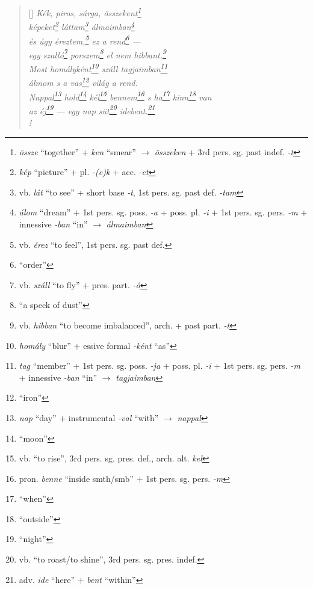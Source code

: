 \documentclass[a4paper,12pt,twoside,final]{book}
\begin{document}

\newpage

\settowidth{\versewidth}{Nappal hold kél bennem s ha kinn van}

\begin{verse}[\versewidth]
  \it
  Kék, piros, sárga, összekent\footnote{\emph{össze} ``together'' +
  \emph{ken} ``smear'' $\rightarrow$ \emph{összeken} + 3rd
  pers. sg. past indef. \emph{-t}} \\
  képeket\footnote{\emph{kép} ``picture'' + pl. \emph{-(e)k} +
  acc. \emph{-et}} láttam\footnote{vb. \emph{lát} ``to see'' +
  short base \emph{-t}, 1st pers. sg. past def. \emph{-tam}}
  álmaimban\footnote{\emph{álom} ``dream'' +
  1st pers. sg. poss. \emph{-a} + poss. pl. \emph{-i} + 1st
  pers. sg. pers. \emph{-m} + innessive \emph{-ban} ``in'' $\rightarrow$
  \emph{álmaimban}} \\
  és úgy éreztem,\footnote{vb. \emph{érez} ``to feel'', 1st
  pers. sg. past def.} ez a rend\footnote{``order''} --- \\
  egy szalló\footnote{vb. \emph{száll} ``to fly'' +
  pres. part. \emph{-ó}} porszem\footnote{``a speck of dust''} el nem
  hibbant.\footnote{vb. \emph{hibban}
  ``to become imbalanced'', arch. + past part. \emph{-t}} \\
  Most homályként\footnote{\emph{homály} ``blur'' +
  essive formal \emph{-ként} ``as''} száll tagjaimban\footnote{\emph{tag}
  ``member'' + 1st pers. sg. poss. \emph{-ja} +
  poss. pl. \emph{-i} + 1st pers. sg. pers. \emph{-m} +
  innessive \emph{-ban} ``in'' $\rightarrow$ \emph{tagjaimban}} \\
  álmom s a vas\footnote{``iron''} világ a rend. \\
  Nappal\footnote{\emph{nap} ``day'' + instrumental \emph{-val}
  ``with'' $\rightarrow$ \emph{nappal}} hold\footnote{``moon''}
  kél\footnote{vb. ``to rise'', 3rd pers. sg. pres. def.,
  arch. alt. \emph{kel}} bennem\footnote{pron. \emph{benne} ``inside
  smth/smb'' + 1st pers. sg. pers. \emph{-m}} s ha\footnote{``when''}
  kinn\footnote{``outside''} van  \\
  az éj\footnote{``night''} --- egy nap süt\footnote{vb. ``to
  roast/to shine'', 3rd pers. sg. pres. indef.}
  idebent.\footnote{adv. \emph{ide} ``here'' + \emph{bent} ``within''} \\!
\end{verse}
\end{document}
